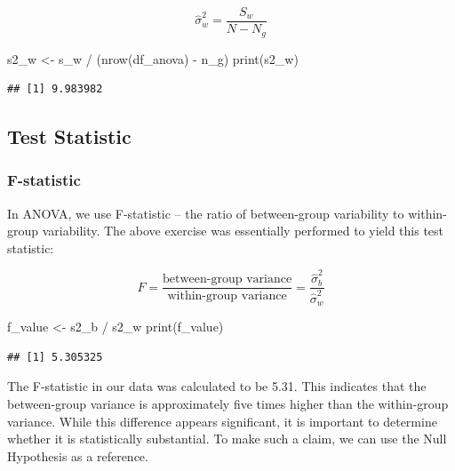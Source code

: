 \documentclass[
]{article}
\newenvironment{Shaded}{\begin{snugshade}}{\end{snugshade}}
\newcommand{\FunctionTok}[1]{\textcolor[rgb]{0.00,0.00,0.00}{#1}}
\newcommand{\NormalTok}[1]{#1}
\newcommand{\OtherTok}[1]{\textcolor[rgb]{0.56,0.35,0.01}{#1}}
\newcommand{\SpecialCharTok}[1]{\textcolor[rgb]{0.00,0.00,0.00}{#1}}
\begin{document}
\[
\hat{\sigma}^2_w = \frac{S_w}{N-N_g}
\]

\begin{Shaded}
\begin{Highlighting}[]
\NormalTok{s2\_w }\OtherTok{\textless{}{-}}\NormalTok{ s\_w }\SpecialCharTok{/}\NormalTok{ (}\FunctionTok{nrow}\NormalTok{(df\_anova) }\SpecialCharTok{{-}}\NormalTok{ n\_g)}
\FunctionTok{print}\NormalTok{(s2\_w)}
\end{Highlighting}
\end{Shaded}

\begin{verbatim}
## [1] 9.983982
\end{verbatim}

\hypertarget{test-statistic-1}{%
\subsection{Test Statistic}\label{test-statistic-1}}

\hypertarget{f-statistic}{%
\subsubsection{F-statistic}\label{f-statistic}}

In ANOVA, we use F-statistic -- the ratio of between-group variability to within-group variability. The above exercise was essentially performed to yield this test statistic:

\[
F = \frac{\text{between-group variance}}{\text{within-group variance}} = \frac{\hat{\sigma}^2_b}{\hat{\sigma}^2_w}
\]

\begin{Shaded}
\begin{Highlighting}[]
\NormalTok{f\_value }\OtherTok{\textless{}{-}}\NormalTok{ s2\_b }\SpecialCharTok{/}\NormalTok{ s2\_w}
\FunctionTok{print}\NormalTok{(f\_value)}
\end{Highlighting}
\end{Shaded}

\begin{verbatim}
## [1] 5.305325
\end{verbatim}

The F-statistic in our data was calculated to be 5.31. This indicates that the between-group variance is approximately five times higher than the within-group variance. While this difference appears significant, it is important to determine whether it is statistically substantial. To make such a claim, we can use the Null Hypothesis as a reference.
\end{document}
